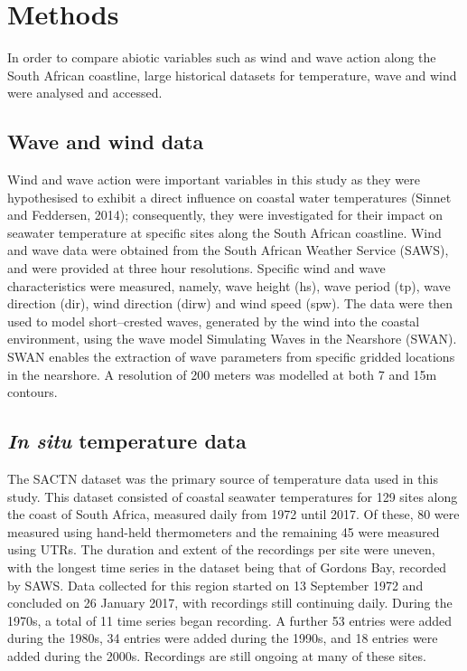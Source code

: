 \documentclass[12pt,a4paper,]{article}
\begin{document}
\hypertarget{methods}{%
\section{Methods}\label{methods}}

In order to compare abiotic variables such as wind and wave action along
the South African coastline, large historical datasets for temperature,
wave and wind were analysed and accessed.

\hypertarget{wave-and-wind-data}{%
\subsection{Wave and wind data}\label{wave-and-wind-data}}

Wind and wave action were important variables in this study as they were
hypothesised to exhibit a direct influence on coastal water temperatures
(Sinnet and Feddersen, 2014); consequently, they were investigated for
their impact on seawater temperature at specific sites along the South
African coastline. Wind and wave data were obtained from the South
African Weather Service (SAWS), and were provided at three hour
resolutions. Specific wind and wave characteristics were measured,
namely, wave height (hs), wave period (tp), wave direction (dir), wind
direction (dirw) and wind speed (spw). The data were then used to model
short--crested waves, generated by the wind into the coastal
environment, using the wave model Simulating Waves in the Nearshore
(SWAN). SWAN enables the extraction of wave parameters from specific
gridded locations in the nearshore. A resolution of 200 meters was
modelled at both 7 and 15m contours.

\hypertarget{in-situ-temperature-data}{%
\subsection{\texorpdfstring{\emph{In situ} temperature
data}{In situ temperature data}}\label{in-situ-temperature-data}}

The SACTN dataset was the primary source of temperature data used in
this study. This dataset consisted of coastal seawater temperatures for
129 sites along the coast of South Africa, measured daily from 1972
until 2017. Of these, 80 were measured using hand-held thermometers and
the remaining 45 were measured using UTRs. The duration and extent of
the recordings per site were uneven, with the longest time series in the
dataset being that of Gordons Bay, recorded by SAWS. Data collected for
this region started on 13 September 1972 and concluded on 26 January
2017, with recordings still continuing daily. During the 1970s, a total
of 11 time series began recording. A further 53 entries were added
during the 1980s, 34 entries were added during the 1990s, and 18 entries
were added during the 2000s. Recordings are still ongoing at many of
these sites.
\end{document}
